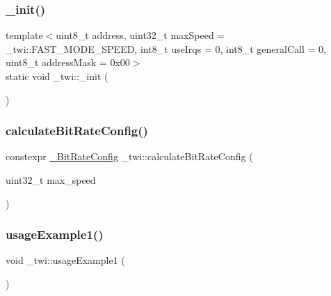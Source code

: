 \subsubsection{\texorpdfstring{\+\_\+init()}{\_init()}}
{\footnotesize\ttfamily template$<$uint8\+\_\+t address, uint32\+\_\+t max\+Speed = \+\_\+twi\+::\+F\+A\+S\+T\+\_\+\+M\+O\+D\+E\+\_\+\+S\+P\+E\+ED, int8\+\_\+t use\+Irqs = 0, int8\+\_\+t general\+Call = 0, uint8\+\_\+t address\+Mask = 0x00$>$ \\
static void \+\_\+twi\+::\+\_\+init (\begin{DoxyParamCaption}{ }\end{DoxyParamCaption})\hspace{0.3cm}{\ttfamily [static]}}

\hypertarget{namespace__twi_ac0eaf0acb1c59c94a82785cebf218fa4}{}\label{namespace__twi_ac0eaf0acb1c59c94a82785cebf218fa4} 
\subsubsection{\texorpdfstring{calculate\+Bit\+Rate\+Config()}{calculateBitRateConfig()}}
{\footnotesize\ttfamily constexpr \hyperlink{struct__twi_1_1__BitRateConfig}{\+\_\+\+Bit\+Rate\+Config} \+\_\+twi\+::calculate\+Bit\+Rate\+Config (\begin{DoxyParamCaption}\item[{uint32\+\_\+t}]{max\+\_\+speed }\end{DoxyParamCaption})}

\hypertarget{namespace__twi_a94dc1b0e503371a6986c795e510c6d46}{}\label{namespace__twi_a94dc1b0e503371a6986c795e510c6d46} 
\subsubsection{\texorpdfstring{usage\+Example1()}{usageExample1()}}
{\footnotesize\ttfamily void \+\_\+twi\+::usage\+Example1 (\begin{DoxyParamCaption}{ }\end{DoxyParamCaption})}

\hypertarget{namespace__twi_a5456b34a1718df6a3be53c87a3067aea}{}\label{namespace__twi_a5456b34a1718df6a3be53c87a3067aea} 
